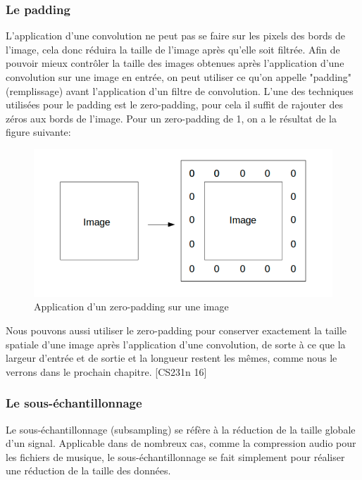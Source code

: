 \subsubsection{Le padding}

	L'application d'une convolution ne peut pas se faire sur les pixels des bords de l'image, cela donc réduira la taille de l'image après qu'elle soit filtrée. Afin de pouvoir mieux contrôler la taille des images obtenues après l'application d'une convolution sur une image en entrée, on peut utiliser ce qu'on appelle "padding" (remplissage) avant l'application d'un filtre de convolution.
	L'une des techniques utilisées pour le padding est le zero-padding, pour cela il suffit de rajouter des zéros aux bords de l'image. Pour un zero-padding de 1, on a le résultat de la figure suivante:

\begin{figure}[H]
	\centering
		\includegraphics[width=5in]{Figures/zero-padding.png}
	\caption[An Electron]{Application d'un zero-padding sur une image}
	\label{fig:Electron}
\end{figure}

	Nous pouvons aussi utiliser le zero-padding pour conserver exactement la taille spatiale d'une image après l'application d'une convolution, de sorte à ce que la largeur d'entrée et de sortie et la longueur restent les mêmes, comme nous le verrons dans le prochain chapitre. [CS231n 16]


\subsubsection{Le sous-échantillonnage}

	Le sous-échantillonnage (subsampling) se réfère à la réduction de la taille globale d'un signal. Applicable dans de nombreux cas, comme la compression audio pour les fichiers de musique, le sous-échantillonnage se fait simplement pour réaliser une réduction de la taille des données. 

